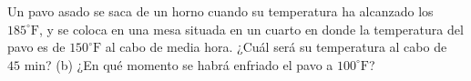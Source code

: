 \item Un pavo asado se saca de un horno cuando su temperatura ha alcanzado los $185^\circ\text{F}$, y se coloca en una mesa situada en un cuarto en donde la temperatura del pavo es de $150^\circ\text{F}$ al cabo de media hora. ¿Cuál será su temperatura al cabo de $45 \text{ min}$? (b) ¿En qué momento se habrá enfriado el pavo a $100^\circ\text{F}$?
